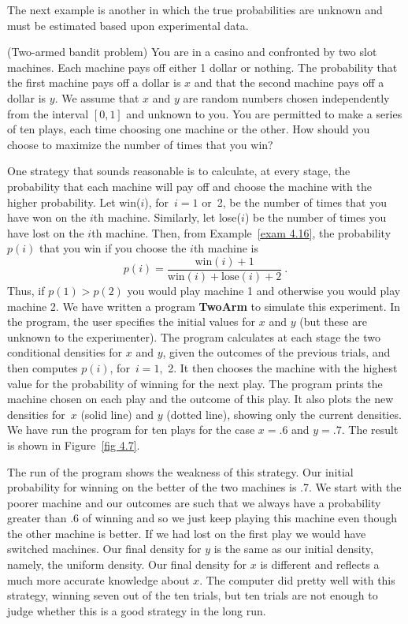The next example is another in which the true probabilities are unknown and must be
estimated based upon experimental data.

\begin{example}(Two-armed bandit problem)\label{exam 4.17}
You are in a casino and confronted by two slot machines.  Each machine pays off
either 1 dollar or nothing.  The probability that the first machine pays off a
dollar is $x$ and that the second machine pays off a dollar is $y$.  We assume
that $x$ and $y$ are random numbers chosen independently from the interval
$[0,1]$ and unknown to you.  You are permitted to make a series of ten plays,
each time choosing one machine or the other.  How should you choose to maximize
the number of times that you win?

One strategy that sounds reasonable is to calculate, at every stage, the
probability that each machine will pay off and choose the machine with the
higher probability.  Let win($i$), for~$i = 1$ or~2, be the number of times
that you have won on the $i$th machine.  Similarly, let lose($i$) be the number
of times you have lost on the $i$th machine.  Then, from Example~\ref{exam
4.16}, the probability $p(i)$ that you win if you choose the $i$th machine is 
$$
p(i) = \frac {{\mbox{win}}(i) + 1} {{\mbox{win}}(i) + {\mbox{lose}}(i) + 2}\ .
$$
Thus, if $p(1) > p(2)$ you would play machine 1 and otherwise you would play
machine 2.  We have written a program {\bf TwoArm} to simulate this
experiment.  In the program, the user specifies the initial values for $x$ and
$y$ (but these are unknown to the experimenter).  The program calculates at
each stage the two conditional densities for $x$ and $y$, given the outcomes of
the previous trials, and then computes $p(i)$, for~$i = 1$,~2.  It then chooses
the machine with the highest value for the probability of winning for the next
play.  The program prints the machine chosen on each play and the outcome of
this play.  It also plots the new densities for~$x$ (solid line) and $y$
(dotted line), showing only the current densities.  We have run the program for
ten plays for the case $x = .6$ and $y = .7$.  The result is shown in
Figure~\ref{fig 4.7}.


The run of the program shows the weakness of this strategy.  Our initial
probability for winning on the better of the two machines is .7.  We start with
the poorer machine and our outcomes are such that we always have a probability
greater than .6 of winning and so we just keep playing this machine even though
the other machine is better.  If we had lost on the first play we would have
switched machines.  Our final density for $y$ is the same as our initial
density, namely, the uniform density.  Our final density for $x$ is different
and reflects a much more accurate knowledge about $x$.  The computer did pretty
well with this strategy, winning seven out of the ten trials, but ten trials
are not enough to judge whether this is a good strategy in the long run.


\end{example}
